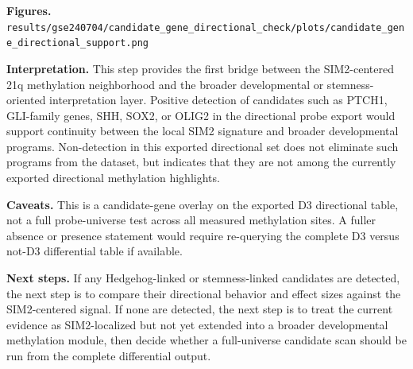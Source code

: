 \textbf{Figures.}
\texttt{results/gse240704/candidate\_gene\_directional\_check/plots/candidate\_gene\_directional\_support.png}

\textbf{Interpretation.}
This step provides the first bridge between the SIM2-centered 21q methylation neighborhood and the broader developmental or stemness-oriented interpretation layer. Positive detection of candidates such as PTCH1, GLI-family genes, SHH, SOX2, or OLIG2 in the directional probe export would support continuity between the local SIM2 signature and broader developmental programs. Non-detection in this exported directional set does not eliminate such programs from the dataset, but indicates that they are not among the currently exported directional methylation highlights.

\textbf{Caveats.}
This is a candidate-gene overlay on the exported D3 directional table, not a full probe-universe test across all measured methylation sites. A fuller absence or presence statement would require re-querying the complete D3 versus not-D3 differential table if available.

\textbf{Next steps.}
If any Hedgehog-linked or stemness-linked candidates are detected, the next step is to compare their directional behavior and effect sizes against the SIM2-centered signal. If none are detected, the next step is to treat the current evidence as SIM2-localized but not yet extended into a broader developmental methylation module, then decide whether a full-universe candidate scan should be run from the complete differential output.

